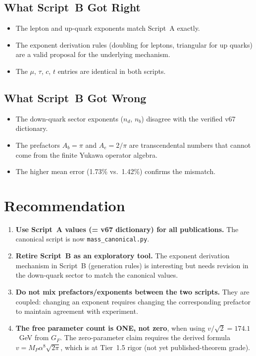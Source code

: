 \documentclass[11pt,a4paper]{article}
\begin{document}
\subsection{What Script~B Got Right}

\begin{itemize}
\item The lepton and up-quark exponents match Script~A exactly.
\item The exponent derivation rules (doubling for leptons, triangular for
  up quarks) are a valid proposal for the underlying mechanism.
\item The $\mu$, $\tau$, $c$, $t$ entries are identical in both scripts.
\end{itemize}

\subsection{What Script~B Got Wrong}

\begin{itemize}
\item The down-quark sector exponents ($n_d$, $n_b$) disagree with the
  verified v67 dictionary.
\item The prefactors $A_b = \pi$ and $A_e = 2/\pi$ are transcendental
  numbers that cannot come from the finite Yukawa operator algebra.
\item The higher mean error (1.73\% vs.\ 1.42\%) confirms the mismatch.
\end{itemize}

\section{Recommendation}
\label{sec:recommendation}

\begin{enumerate}
\item \textbf{Use Script~A values (= v67 dictionary) for all publications.}
  The canonical script is now \texttt{mass\_canonical.py}.

\item \textbf{Retire Script~B as an exploratory tool.}
  The exponent derivation mechanism in Script~B (generation rules) is
  interesting but needs revision in the down-quark sector to match the
  canonical values.

\item \textbf{Do not mix prefactors/exponents between the two scripts.}
  They are coupled: changing an exponent requires changing the corresponding
  prefactor to maintain agreement with experiment.

\item \textbf{The free parameter count is ONE, not zero}, when using
  $v/\sqrt{2} = 174.1$~GeV from $G_F$.  The zero-parameter claim requires
  the derived formula $v = M_P\alpha^8\sqrt{2\pi}$, which is at Tier~1.5
  rigor (not yet published-theorem grade).
\end{enumerate}
\end{document}
